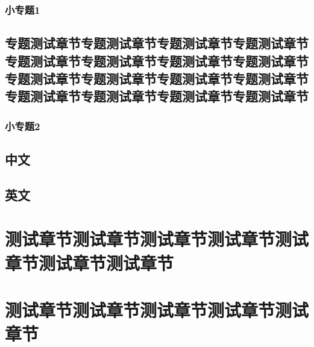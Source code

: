 \documentclass[color=yellow,openany]{textbook-cn}%
\begin{document}
\begin{Topic}

\section{小专题1}


\Example{\zhlipsum[1]}



\chapter{专题测试章节专题测试章节专题测试章节专题测试章节专题测试章节专题测试章节专题测试章节专题测试章节专题测试章节专题测试章节专题测试章节专题测试章节专题测试章节专题测试章节专题测试章节专题测试章节}

\zhlipsum


\section{小专题2}
	
\end{Topic}


\begin{Appendix}


%
%
%

\end{Appendix}



\begin{Appendix}
\chapter[WWWW]{中文}
\zhlipsum
	
\chapter{英文}
\zhlipsum
\end{Appendix}


\part{测试章节测试章节测试章节测试章节测试章节测试章节测试章节}
\part[测试章节]{测试章节测试章节测试章节测试章节测试章节}

\lipsum\lipsum
\end{document}
